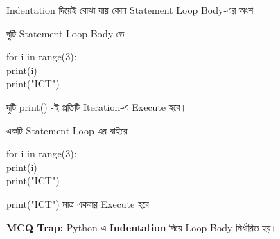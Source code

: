 

Indentation দিয়েই বোঝা যায় কোন Statement Loop Body-এর অংশ।

\noindent
\begin{minipage}[t]{0.49\linewidth}

\begin{sideexamplebox}{দুটি Statement Loop Body-তে}

\begin{sidecodebox}
\begin{english}
\ttfamily
for i in range(3):\\
\hspace*{4mm}print(i)\\
\hspace*{4mm}print("ICT")
\end{english}
\end{sidecodebox}

দুটি
\textenglish{\ttfamily print()}
-ই প্রতিটি Iteration-এ Execute হবে।

\end{sideexamplebox}

\end{minipage}
\hfill
\begin{minipage}[t]{0.49\linewidth}

\begin{sideexamplebox}{একটি Statement Loop-এর বাইরে}

\begin{sidecodebox}
\begin{english}
\ttfamily
for i in range(3):\\
\hspace*{4mm}print(i)\\[0.5mm]
print("ICT")
\end{english}
\end{sidecodebox}

\textenglish{\ttfamily print("ICT")}
মাত্র একবার Execute হবে।

\end{sideexamplebox}

\end{minipage}

\begin{rememberbox}

\textbf{\color{deepOrange}MCQ Trap:}
\quad
Python-এ
\textbf{Indentation}
দিয়ে Loop Body নির্ধারিত হয়।

\end{rememberbox}

